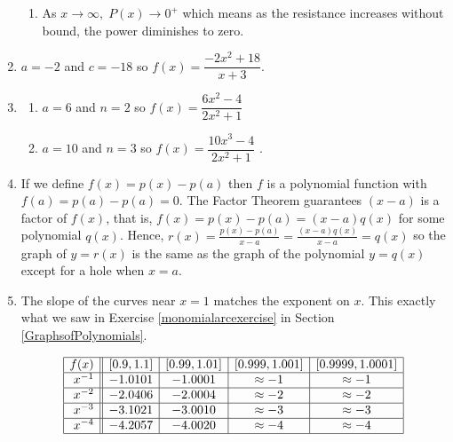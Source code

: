 \documentclass{ximera}
\begin{document}
\begin{enumerate}
\begin{enumerate}
\item As $x \rightarrow \infty, \; P(x) \rightarrow 0^{+}$ which means as the resistance increases without bound, the power diminishes to zero.

\end{enumerate}

\item  $a = -2$ and $c = -18$ so $f(x) = \dfrac{-2x^2+18}{x+3}$.

\item  \begin{multicols}{2}

 \begin{enumerate}

\item   $a=6$ and $n=2$ so $f(x) = \dfrac{6x^{2} -4}{2x^2+1}$

\item  $a=10$ and $n = 3$ so $f(x) = \dfrac{10x^{3} -4}{2x^2+1}$ .

\end{enumerate}
\end{multicols}


\item  If we define $f(x) = p(x) - p(a)$ then $f$ is a polynomial function with $f(a) = p(a) - p(a) = 0$.  The Factor Theorem guarantees $(x-a)$ is a factor of $f(x)$, that is, $f(x) = p(x) - p(a) = (x-a)q(x)$ for some polynomial $q(x)$. Hence, $r(x) = \frac{p(x)-p(a)}{x-a} = \frac{(x-a)q(x)}{x-a} = q(x)$ so the graph of $y = r(x)$ is the same as the graph of the polynomial $y = q(x)$ except for a hole when $x = a$.

\item  The slope of the curves near $x=1$ matches the exponent on $x$.  This exactly what we saw in  Exercise \ref{monomialarcexercise} in Section \ref{GraphsofPolynomials}.

\[ \begin{array}{|r||c|c|c|c|}  \hline

 f(x) &  [0.9, 1.1] & [0.99, 1.01] &[0.999, 1.001] & [0.9999, 1.0001]  \\ \hline
 x^{-1} & -1.0101 & -1.0001 & \approx -1 & \approx -1  \\  \hline
 x^{-2}& -2.0406& -2.0004 & \approx -2 & \approx -2   \\  \hline
 x^{-3} &-3.1021 & -3.0010 & \approx -3 & \approx -3   \\  \hline
 x^{-4} &-4.2057 & -4.0020 &\approx -4 & \approx -4   \\   \hline


\end{array} \]

\end{enumerate} 
\end{document}
